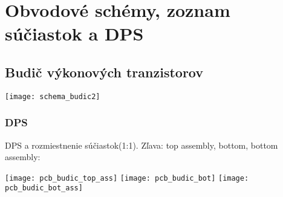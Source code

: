 \chapter{Obvodové schémy, zoznam súčiastok a DPS} \label{ch:priloha_schemy}

\newpage
\section{Budič výkonových tranzistorov} \label{sec:append_budic}

\hspace{-1.8cm}\texttt{[image: schema\_budic2]}


\subsection{DPS}
DPS a rozmiestnenie súčiastok(1:1). Zľava: top assembly, bottom, bottom assembly:\vspace{0pt}

\texttt{[image: pcb\_budic\_top\_ass]}
\texttt{[image: pcb\_budic\_bot]}
\texttt{[image: pcb\_budic\_bot\_ass]}

\newpage
